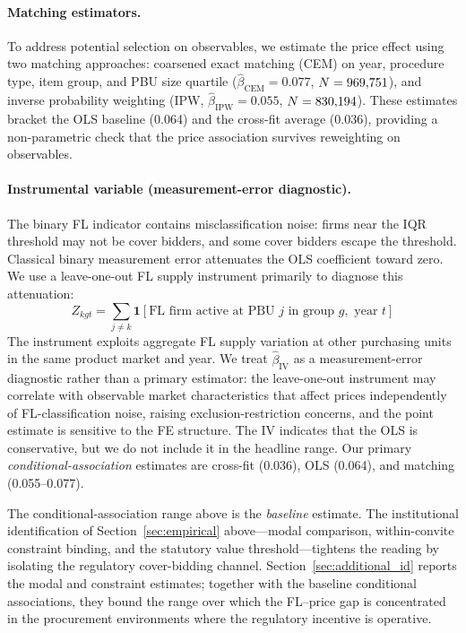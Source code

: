 \paragraph{Matching estimators.}
To address potential selection on observables, we estimate the
price effect using two matching approaches: coarsened exact
matching (CEM) on year, procedure type, item group, and PBU size
quartile ($\hat{\beta}_{\text{CEM}} = 0.077$, $N = 969{,}751$), and
inverse probability weighting (IPW, $\hat{\beta}_{\text{IPW}} = 0.055$,
$N = 830{,}194$). These estimates bracket the OLS baseline (0.064)
and the cross-fit average (0.036), providing a non-parametric check
that the price association survives reweighting on observables.

\paragraph{Instrumental variable (measurement-error diagnostic).}
The binary FL indicator contains misclassification noise: firms near
the IQR threshold may not be cover bidders, and some cover bidders
escape the threshold. Classical binary measurement error attenuates
the OLS coefficient toward zero. We use a leave-one-out FL supply
instrument primarily to diagnose this attenuation:
\begin{equation}
  Z_{kgt} = \sum_{j \neq k} \mathbf{1}[\text{FL firm active at PBU } j
  \text{ in group } g, \text{ year } t]
  \label{eq:iv_v6}
\end{equation}
The instrument exploits aggregate FL supply variation at other
purchasing units in the same product market and year. We treat
$\hat{\beta}_{\text{IV}}$ as a measurement-error diagnostic rather
than a primary estimator: the leave-one-out instrument may correlate
with observable market characteristics that affect prices
independently of FL-classification noise, raising
exclusion-restriction concerns, and the point estimate is sensitive
to the FE structure. The IV indicates that the OLS is conservative,
but we do not include it in the headline range. Our primary
\emph{conditional-association} estimates are cross-fit (0.036), OLS
(0.064), and matching (0.055--0.077).

The conditional-association range above is the \emph{baseline}
estimate. The institutional identification of
Section~\ref{sec:empirical} above---modal comparison, within-convite
constraint binding, and the statutory value threshold---tightens
the reading by isolating the regulatory cover-bidding channel.
Section~\ref{sec:additional_id} reports the modal and constraint
estimates; together with the baseline conditional associations,
they bound the range over which the FL--price gap is concentrated
in the procurement environments where the regulatory incentive is
operative.

